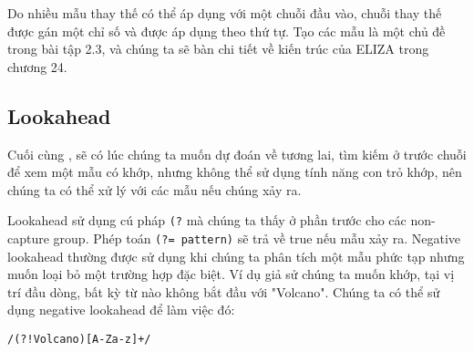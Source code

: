 Do nhiều mẫu thay thế có thể áp dụng với một chuỗi đầu vào, chuỗi thay thế được gán một chỉ số và được áp dụng theo thứ tự. Tạo các mẫu là một chủ đề trong bài tập 2.3, và chúng ta sẽ bàn chi tiết về kiến trúc của ELIZA trong chương 24.

\vspace{20em}

\subsection{Lookahead}

Cuối cùng , sẽ có lúc chúng ta muốn dự đoán về tương lai, tìm kiếm ở trước chuỗi để xem một mẫu có khớp, nhưng không thể sử dụng tính năng con trỏ khớp, nên chúng ta có thể xử lý với các mẫu nếu chúng xảy ra.

Lookahead sử dụng cú pháp \verb|(?| mà chúng ta thấy ở phần trước cho các non-capture group. Phép toán \verb|(?= pattern)| sẽ trả về true nếu mẫu xảy ra. Negative lookahead thường được sử dụng khi chúng ta phân tích một mẫu phức tạp nhưng muốn loại bỏ một trường hợp đặc biệt. Ví dụ giả sử chúng ta muốn khớp, tại vị trí đầu dòng, bất kỳ từ nào không bắt đầu với "Volcano". Chúng ta có thể sử dụng negative lookahead để làm việc đó:

\vspace{0.6em}

\noindent \texttt{/(?!Volcano)[A-Za-z]+/}

\vspace{0.6em}

